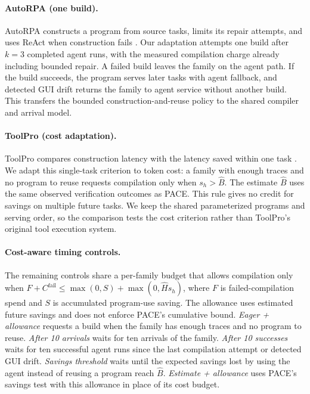 \paragraph{AutoRPA (one build).}
AutoRPA constructs a program from source tasks, limits its repair attempts, and uses ReAct when construction fails \citep{chen2026autorpa}.
Our adaptation attempts one build after $k=3$ completed agent runs, with the measured compilation charge already including bounded repair.
A failed build leaves the family on the agent path.
If the build succeeds, the program serves later tasks with agent fallback, and detected GUI drift returns the family to agent service without another build.
This transfers the bounded construction-and-reuse policy to the shared compiler and arrival model.

\paragraph{ToolPro (cost adaptation).}
ToolPro compares construction latency with the latency saved within one task \citep{liu2026toolpro}.
We adapt this single-task criterion to token cost: a family with enough traces and no program to reuse requests compilation only when $s_h>\hat B$.
The estimate $\hat B$ uses the same observed verification outcomes as PACE.
This rule gives no credit for savings on multiple future tasks.
We keep the shared parameterized programs and serving order, so the comparison tests the cost criterion rather than ToolPro's original tool execution system.

\paragraph{Cost-aware timing controls.}
The remaining controls share a per-family budget that allows compilation only when $F+C^{\mathrm{fail}}\leq\max(0,S)+\max(0,\hat Hs_h)$, where $F$ is failed-compilation spend and $S$ is accumulated program-use saving.
The allowance uses estimated future savings and does not enforce PACE's cumulative bound.
\emph{Eager + allowance} requests a build when the family has enough traces and no program to reuse.
\emph{After 10 arrivals} waits for ten arrivals of the family.
\emph{After 10 successes} waits for ten successful agent runs since the last compilation attempt or detected GUI drift.
\emph{Savings threshold} waits until the expected savings lost by using the agent instead of reusing a program reach $\hat B$.
\emph{Estimate + allowance} uses PACE's savings test with this allowance in place of its cost budget.

